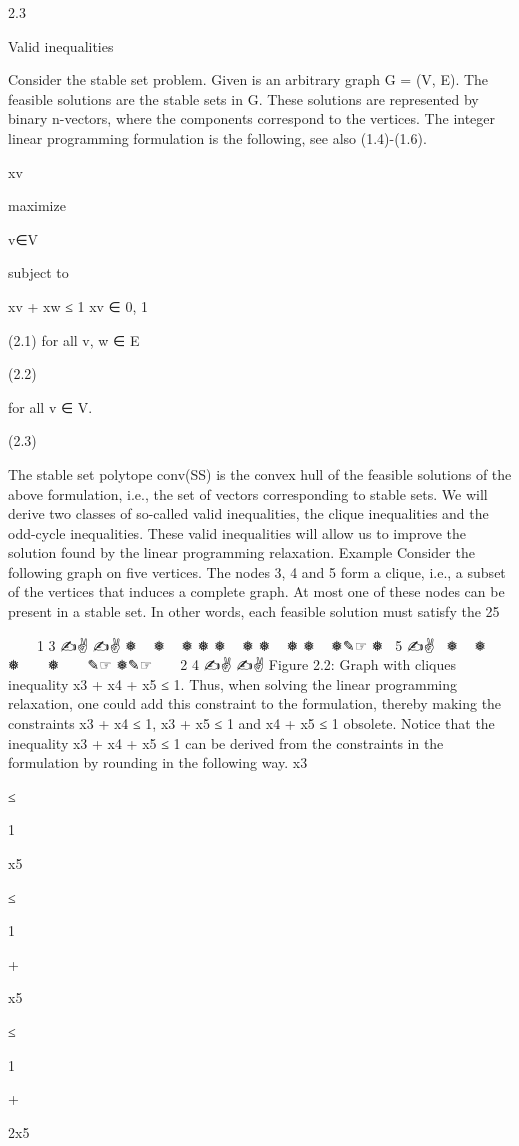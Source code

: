 \documentclass[titlepage]{book}
\theoremstyle{definition}
\begin{document}
2.3

Valid inequalities

Consider the stable set problem. Given is an arbitrary graph G = (V, E). The feasible solutions are the
stable sets in G. These solutions are represented by binary n-vectors, where the components correspond
to the vertices. The integer linear programming formulation is the following, see also (1.4)-(1.6).

xv

maximize

v∈V

subject to

xv + xw ≤ 1
xv ∈ {0, 1}

(2.1)
for all {v, w} ∈ E

(2.2)

for all v ∈ V.

(2.3)

The stable set polytope conv(SS) is the convex hull of the feasible solutions of the above formulation,
i.e., the set of vectors corresponding to stable sets.
We will derive two classes of so-called valid inequalities, the clique inequalities and the odd-cycle inequalities. These valid inequalities will allow us to improve the solution found by the linear programming
relaxation.
Example
Consider the following graph on five vertices.
The nodes 3, 4 and 5 form a clique, i.e., a subset of the vertices that induces a complete graph. At most
one of these nodes can be present in a stable set. In other words, each feasible solution must satisfy the
25

✎☞
✎☞
1
3
✍✌
✍✌
❅
 
❅
  ❅
❅
❅
 
❅
❅
 
❅
❅
 
❅✎☞
❅ 
5
✍✌
 ❅
 
❅
 
 
❅
 
 
❅
 
 
✎☞
❅✎☞
 
 
2
4
✍✌
✍✌
Figure 2.2: Graph with cliques
inequality x3 + x4 + x5 ≤ 1. Thus, when solving the linear programming relaxation, one could add this
constraint to the formulation, thereby making the constraints x3 + x4 ≤ 1, x3 + x5 ≤ 1 and x4 + x5 ≤ 1
obsolete.
Notice that the inequality x3 + x4 + x5 ≤ 1 can be derived from the constraints in the formulation by
rounding in the following way.
x3

≤

1

x5

≤

1

+

x5

≤

1

+

2x5
\end{document}
